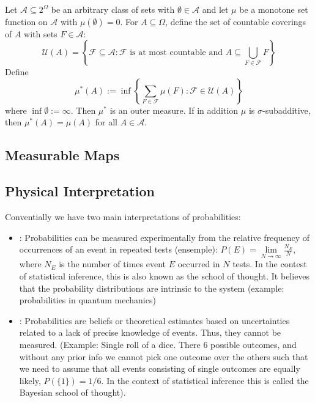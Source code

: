 \documentclass[12pt, a4paper, oneside, openright, titlepage]{book}
\begin{document}
\begin{lem}
    Let $\mathcal{A}\subseteq 2^{\Omega}$ be an arbitrary class of sets with $\emptyset \in \mathcal{A}$ and let $\mu$ be a monotone set function on $\mathcal{A}$ with $\mu(\emptyset) = 0$. For $A \subseteq \Omega$, define the set of countable coverings of $A$ with sets $F \in \mathcal{A}$: \begin{equation*}
        \mathcal{U}(A) = \left\{\mathcal{F} \subseteq \mathcal{A}:\mathcal{F} \text{ is at most countable and } A \subseteq \bigcup_{F\in\mathcal{F}}F\right\}
    \end{equation*}
    Define \begin{equation*}
        \mu^*(A) := \inf\left\{\sum_{F\in\mathcal{F}}\mu(F):\mathcal{F}\in\mathcal{U}(A)\right\}
    \end{equation*}
    where $\inf\emptyset := \infty$. Then $\mu^*$ is an outer measure. If in addition $\mu$ is $\sigma$-subadditive, then $\mu^*(A) = \mu(A)$ for all $A \in \mathcal{A}$.
\end{lem}



\subsection{Measurable Maps}


\subsection{Physical Interpretation}

Conventially we have two main interpretations of probabilities:

\begin{itemize}
    \item {}: Probabilities can be measured experimentally from the relative frequency of occurrences of an event in repeated tests (ensemple): $P(E) = \lim\limits_{N\rightarrow \infty}\frac{N_E}{N}$, where $N_E$ is the number of times event $E$ occurred in $N$ tests. In the contest of statistical inference, this is also known as the  school of thought. It believes that the probability distributions are intrinsic to the system (example: probabilities in quantum mechanics)
    \item {}: Probabilities are beliefs or theoretical estimates based on uncertainties related to a lack of precise knowledge of events. Thus, they cannot be measured. (Example: Single roll of a dice. There 6 possible outcomes, and without any prior info we cannot pick one outcome over the others such that we need to assume that all events consisting of single outcomes are equally likely, $P(\{1\}) = 1/6$. In the context of statistical inference this is called the Bayesian school of thought).
\end{itemize}
\end{document}
